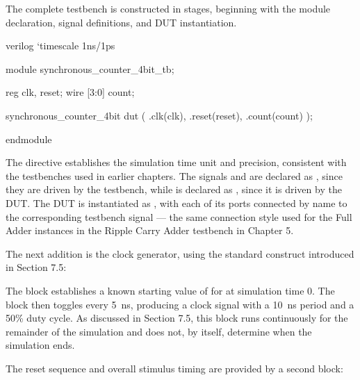 The complete testbench is constructed in stages, beginning with the module declaration, signal definitions, and DUT instantiation.

\begin{codeblock}{verilog}
`timescale 1ns/1ps

module synchronous_counter_4bit_tb;

    reg clk, reset;
    wire [3:0] count;

    synchronous_counter_4bit dut (
        .clk(clk),
        .reset(reset),
        .count(count)
    );

endmodule
\end{codeblock}

The  directive establishes the simulation time unit and precision, consistent with the testbenches used in earlier chapters. The signals  and  are declared as , since they are driven by the testbench, while  is declared as , since it is driven by the DUT. The DUT is instantiated as , with each of its ports connected by name to the corresponding testbench signal --- the same connection style used for the Full Adder instances in the Ripple Carry Adder testbench in Chapter 5.

The next addition is the clock generator, using the standard construct introduced in Section 7.5:


The  block establishes a known starting value of  for  at simulation time 0. The  block then toggles  every 5~ns, producing a clock signal with a 10~ns period and a 50\% duty cycle. As discussed in Section 7.5, this block runs continuously for the remainder of the simulation and does not, by itself, determine when the simulation ends.

The reset sequence and overall stimulus timing are provided by a second  block:


